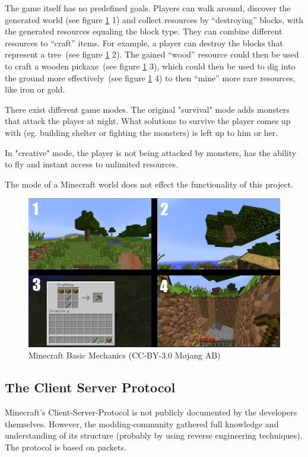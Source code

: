 The game itself has no predefined goals. Players can walk around, discover the generated world (see figure \ref{mc_mechanics} 1) and collect resources by ``destroying'' blocks, with the generated resources equaling the block type. They can combine different resources to ``craft'' items. For example, a player can destroy the blocks that represent a tree~(see figure \ref{mc_mechanics} 2). The gained ``wood'' resource could then be used to craft a wooden pickaxe~(see figure \ref{mc_mechanics} 3), which could then be used to dig into the ground more effectively~(see figure \ref{mc_mechanics} 4) to then ``mine'' more rare resources, like iron or gold.

There exist different game modes. The original "survival" mode adds monsters that attack the player at night. What solutions to survive the player comes up with (eg. building shelter or fighting the monsters) is left up to him or her.

In "creative" mode, the player is not being attacked by monsters, has the ability to fly and instant access to unlimited resources.

The mode of a Minecraft world does not effect the functionality of this project.

\begin{figure}[h]
  \centering
    \includegraphics[width=15cm]{graphics/minecraft_mechanics}
  \caption{Minecraft Basic Mechanics  (CC-BY-3.0 Mojang AB)} %
  \label{mc_mechanics}
\end{figure}

        \subsection{The Client Server Protocol}
Minecraft's Client-Server-Protocol is not publicly documented by the developers themselves. However, the modding-community gathered full knowledge and understanding of its structure (probably by using reverse engineering techniques). The protocol is based on packets. 

